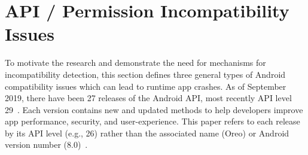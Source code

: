 


\section{API / Permission Incompatibility Issues}\label{sec-background}

To motivate the research and demonstrate the need for mechanisms for incompatibility detection, this section defines three general types of Android compatibility issues which can lead to runtime app crashes.
%
As of September 2019, there have been 27 releases of the Android API, most recently API level 29~\cite{android10}.
Each version contains new and updated methods to help developers improve app performance, security, and user-experience. 
This paper refers to each release by its API level (e.g., 26) rather than the associated name (Oreo) or Android version number (8.0)~\cite{androidversions}. 

